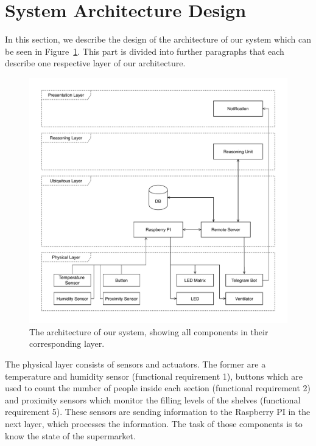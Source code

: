 \documentclass[runningheads]{llncs}
\begin{document}
	\section{System Architecture Design}
	\label{sec:architecture}
	In this section, we describe the design of the architecture of our system which can be seen in Figure~\ref{fig:architecture}.
	This part is divided into further paragraphs that each describe one respective layer of our architecture. 
	\\ \linebreak
	\begin{figure}[bt]
		\centering
		\includegraphics[width=\linewidth]{figures/architecture.pdf}
		\caption{The architecture of our system, showing all components in their corresponding layer.}
		\label{fig:architecture}
	\end{figure}
	\newpage \noindent The physical layer consists of sensors and actuators.
	The former are a temperature and humidity sensor (functional requirement 1), buttons which are used to count the number of people inside each section (functional requirement 2) and proximity sensors which monitor the filling levels of the shelves (functional requirement 5). 
	These sensors are sending information to the Raspberry PI in the next layer, which processes the information. 
	The task of those components is to know the state of the supermarket. 
\end{document}
